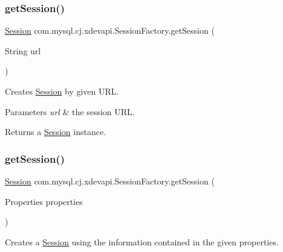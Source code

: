 \subsubsection{\texorpdfstring{get\+Session()}{getSession()}\hspace{0.1cm}{\footnotesize\ttfamily [1/2]}}
{\footnotesize\ttfamily \mbox{\hyperlink{interfacecom_1_1mysql_1_1cj_1_1xdevapi_1_1_session}{Session}} com.\+mysql.\+cj.\+xdevapi.\+Session\+Factory.\+get\+Session (\begin{DoxyParamCaption}\item[{String}]{url }\end{DoxyParamCaption})}

Creates \mbox{\hyperlink{interfacecom_1_1mysql_1_1cj_1_1xdevapi_1_1_session}{Session}} by given U\+RL.


\begin{DoxyParams}{Parameters}
{\em url} & the session U\+RL. \\
\hline
\end{DoxyParams}
\begin{DoxyReturn}{Returns}
a \mbox{\hyperlink{interfacecom_1_1mysql_1_1cj_1_1xdevapi_1_1_session}{Session}} instance. 
\end{DoxyReturn}
\mbox{\label{classcom_1_1mysql_1_1cj_1_1xdevapi_1_1_session_factory_ada2639565b22428f9b0ec6f07d925309}} 
\subsubsection{\texorpdfstring{get\+Session()}{getSession()}\hspace{0.1cm}{\footnotesize\ttfamily [2/2]}}
{\footnotesize\ttfamily \mbox{\hyperlink{interfacecom_1_1mysql_1_1cj_1_1xdevapi_1_1_session}{Session}} com.\+mysql.\+cj.\+xdevapi.\+Session\+Factory.\+get\+Session (\begin{DoxyParamCaption}\item[{Properties}]{properties }\end{DoxyParamCaption})}

Creates a \mbox{\hyperlink{interfacecom_1_1mysql_1_1cj_1_1xdevapi_1_1_session}{Session}} using the information contained in the given properties.


